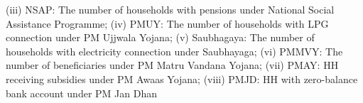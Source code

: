 \begin{table}[!htbp]
\begin{threeparttable}
\begin{tablenotes}[flushleft]
                   (iii) NSAP: The number of households with pensions under National Social Assistance Programme;
                   (iv) PMUY: The number of households with LPG connection under PM Ujjwala Yojana;
                   (v) Saubhagaya: The number of households with electricity connection under Saubhayaga;
                   (vi) PMMVY: The number of beneficiaries under PM Matru Vandana Yojana;
                   (vii) PMAY: HH receiving subsidies under PM Awaas Yojana;
                   (viii) PMJD: HH with zero-balance bank account under PM Jan Dhan
\end{tablenotes}
\end{threeparttable}
\end{table}
